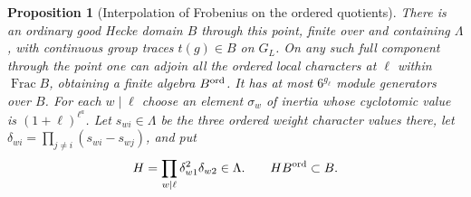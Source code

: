 \documentclass[a4paper,11pt]{article}
\newtheorem{proposition}{Proposition}[section]
\theoremstyle{definition}
\theoremstyle{remark}
\numberwithin{equation}{section}
\begin{document}
\begin{proposition}[Interpolation of Frobenius on the ordered quotients]\leavevmode
\label{prop:heckeorder437}
There is an ordinary good Hecke domain \(B\) through this
point, finite over and containing \(\Lambda\), with continuous
group traces \(t(g)\in B\) on \(G_L\). On any such full
component through the point one can adjoin all the ordered
local characters at \(\ell\) within \(\operatorname{Frac}B\),
obtaining a finite algebra \(B^{\rm ord}\). It has at most
\(6^{g_\ell}\) module generators over \(B\). For each
\(w\mid\ell\) choose an element \(\sigma_w\) of inertia
whose cyclotomic value is \((1+\ell)^{\ell^a}\). Let
\(s_{wi}\in\Lambda\) be the three ordered weight character
values there, let \(\delta_{wi}=\prod_{j\ne i}(s_{wi}-s_{wj})\),
and put
\[
        H=\prod_{w\mid\ell}\delta_{w1}^2\delta_{w2}\in\Lambda.
        \qquad H B^{\rm ord}\subset B .
\]
\end{proposition}
\end{document}
